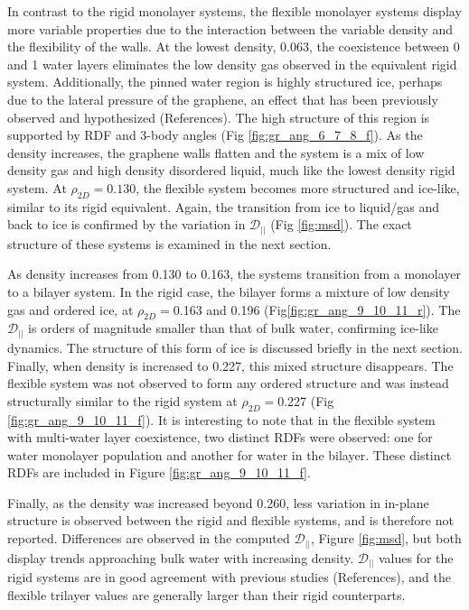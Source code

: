 \documentclass[12pt]{article}
\begin{document}
In contrast to the rigid monolayer systems, the flexible monolayer systems display more variable properties due to the interaction between the variable density and the flexibility of the walls. At the lowest density, 0.063, the coexistence between 0 and 1 water layers eliminates the low density gas observed in the equivalent rigid system. Additionally, the pinned water region is highly structured ice, perhaps due to the lateral pressure of the graphene, an effect that has been previously observed and hypothesized (References). The high structure of this region is supported by RDF and 3-body angles (Fig \ref{fig:gr_ang_6_7_8_f}). As the density increases, the graphene walls flatten and the system is a mix of low density gas and high density disordered liquid, much like the lowest density rigid system. At \(\rho_{2D}=0.130\), the flexible system becomes more structured and ice-like, similar to its rigid equivalent. Again, the transition from ice to liquid/gas and back to ice is confirmed by the variation in \(\mathcal{D}_{||}\) (Fig \ref{fig:msd}). The exact structure of these systems is examined in the next section. 

As density increases from 0.130 to 0.163, the systems transition from a monolayer to a bilayer system. In the rigid case, the bilayer forms a mixture of low density gas and ordered ice, at \(\rho_{2D}=\)0.163 and 0.196 (Fig\ref{fig:gr_ang_9_10_11_r}). The \(\mathcal{D}_{||}\) is orders of magnitude smaller than that of bulk water, confirming ice-like dynamics. The structure of this form of ice is discussed briefly in the next section. Finally, when density is increased to 0.227, this mixed structure disappears. The flexible system was not observed to form any ordered structure and was instead structurally similar to the rigid system at \(\rho_{2D}=\)0.227 (Fig \ref{fig:gr_ang_9_10_11_f}). It is interesting to note that in the flexible system with multi-water layer coexistence, two distinct RDFs were observed: one for water monolayer population and another for water in the bilayer. These distinct RDFs are included in Figure \ref{fig:gr_ang_9_10_11_f}.

Finally, as the density was increased beyond 0.260, less variation in in-plane structure is observed between the rigid and flexible systems, and is therefore not reported. Differences are observed in the computed \(\mathcal{D}_{||}\), Figure \ref{fig:msd}, but both display trends approaching bulk water with increasing density. \(\mathcal{D}_{||}\) values for the rigid systems are in good agreement with previous studies (References), and the flexible trilayer values are generally larger than their rigid counterparts. 
\end{document}

